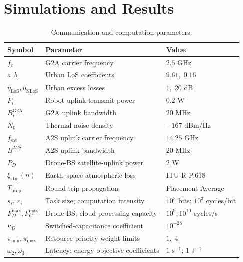\IfFileExists{IEEEtran.cls}{\documentclass[conference]{IEEEtran}}{\documentclass[10pt,twocolumn]{article}}
\begin{document}
\section{Simulations and Results}
\begin{table}[t]
\centering
\caption{Communication and computation parameters.}
\label{tab:nominal_parameters}
\scriptsize
\setlength{\tabcolsep}{5pt}
\begin{tabular}{@{}p{}p{}p{}@{}}
\toprule
Symbol & Parameter & Value \\
\midrule
$f_c$ & G2A carrier frequency & $2.5$ GHz \\
$a,b$ & Urban LoS coefficients & $9.61,\;0.16$ \cite{boryaliniz2016placement} \\
$\eta_{\mathrm{LoS}},\eta_{\mathrm{NLoS}}$ & Urban excess losses & $1,\;20$ dB \cite{boryaliniz2016placement} \\
$P_i$ & Robot uplink transmit power & $0.2$ W \\
$B_i^{\mathrm{G2A}}$ & G2A uplink bandwidth & $20$ MHz \\
$N_0$ & Thermal noise density & $-167$ dBm/Hz \\
\midrule
$f_{\mathrm{sat}}$ & A2S uplink carrier frequency & $14.25$ GHz \\
$B^{\mathrm{A2S}}$ & A2S uplink bandwidth & $20$ MHz \\
$P_D$ & Drone-BS satellite-uplink power & $2$ W \\
$\xi_{\mathrm{atm}}(n)$ & Earth--space atmospheric loss & ITU-R P.618 \cite{iturP618} \\
$T_{\mathrm{prop}}$ & Round-trip propagation & Placement Average \\\midrule
$s_i,\ c_i$ & Task size; computation intensity & $10^5$ bits; $10^3$ cycles/bit \\
$F_D^{\max},F_C^{\max}$ & Drone-BS; cloud processing capacity & $10^9,10^{10}$ cycles/s \\
$\kappa_D$ & Switched-capacitance coefficient & $10^{-28}$ \cite{li2019energy} \\
$\pi_{\min},\pi_{\max}$ & Resource-priority weight limits & $1,\;4$ \\
$\omega_2,\omega_3$ & Latency; energy objective coefficients & $1$ s$^{-1}$; $1$ J$^{-1}$ \\
\bottomrule
\end{tabular}
\end{table}
\end{document}
